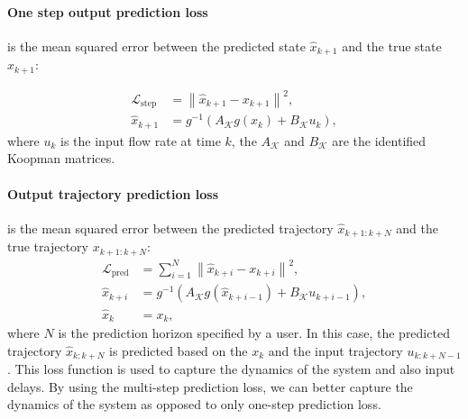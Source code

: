 \documentclass[conference]{IEEEtran}
\begin{document}
\paragraph*{One step output prediction loss}
is the mean squared error between the predicted state \(\hat{x}_{k+1}\) and the true state \(x_{k+1}\):

\begin{subequations}
    \begin{align}
        \mathcal{L}_{\text{step}} & = \left\|\hat{x}_{k+1} - x_{k+1}\right\|^2,       \\
        \hat{x}_{k+1}             & = g^{-1}(A_\mathcal{K}g(x_k) + B_\mathcal{K}u_k),
    \end{align}
\end{subequations}
where \(u_k\) is the input flow rate at time \(k\), the \(A_\mathcal{K}\) and \(B_\mathcal{K}\) are the identified Koopman matrices.

\paragraph*{Output trajectory prediction loss}\label{par:output_loss}
is the mean squared error between the predicted trajectory \(\hat{x}_{k+1:k+N}\) and the true trajectory \(x_{k+1:k+N}\):
\begin{subequations}
    \begin{align}
        \mathcal{L}_{\text{pred}} & = \sum_{i=1}^{N}\left\|\hat{x}_{k+i} - x_{k+i}\right\|^2,                      \\
        \hat{x}_{k+i}             & = g^{-1}\left(A_\mathcal{K}g(\hat{x}_{k+i-1}) + B_\mathcal{K}u_{k+i-1}\right), \\
        \hat{x}_{k}               & = x_{k},
    \end{align}
\end{subequations}
where \(N\) is the prediction horizon specified by a user. In this case, the predicted trajectory \(\hat{x}_{k:k+N}\) is predicted based on the \(x_k\) and the input trajectory \(u_{k:k+N-1}\). This loss function is used to capture the dynamics of the system and also input delays. By using the multi-step prediction loss, we can better capture the dynamics of the system as opposed to only one-step prediction loss.
\end{document}
